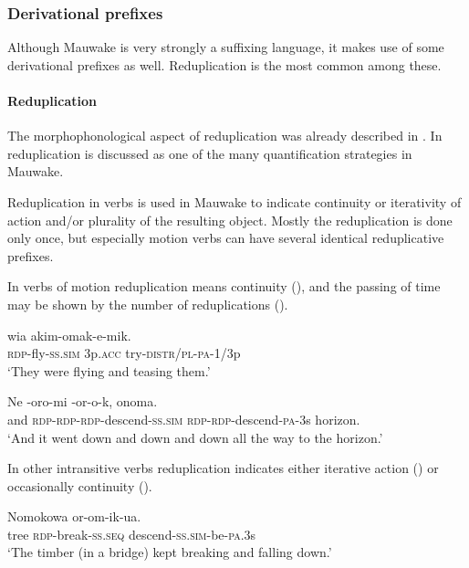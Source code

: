 \subsubsection[Derivational prefixes]{Derivational prefixes}
{}
Although Mauwake is very strongly a suffixing language, it makes use of some derivational prefixes as well. Reduplication is the most common among these. 

\paragraph[Reduplication]{Reduplication}
{}
The morphophonological aspect of reduplication was already described in . In  reduplication is discussed as one of the many quantification strategies in Mauwake.

Reduplication in verbs is used in Mauwake to indicate continuity or iterativity of action and/or plurality of the resulting object. Mostly the reduplication is done only once, but especially motion verbs can have several identical reduplicative prefixes. 

In verbs of motion reduplication means continuity (), and the passing of time may be shown by the number of reduplications ().

\ea%
\label{ex:x218}
\gll {} wia akim-omak-e-mik. \\
\textsc{rdp}-fly-\textsc{ss}.\textsc{sim} 3p.\textsc{acc} try-\textsc{distr}/\textsc{pl}-\textsc{pa}-1/3p \\
\glt`They were flying and teasing them.' 
\z

\ea%
\label{ex:x216}
\gll Ne -oro-mi -or-o-k, onoma.\\
and \textsc{rdp}-\textsc{rdp}-\textsc{rdp}-descend-\textsc{ss}.\textsc{sim} \textsc{rdp}-\textsc{rdp}-descend-\textsc{pa}-3s horizon.\\
\glt`And it went down and down and down all the way to the horizon.'
\z

In other intransitive verbs reduplication indicates either iterative action () or occasionally continuity ().

\ea%
\label{ex:x217}
\gll Nomokowa  or-om-ik-ua. \\
tree \textsc{rdp}-break-\textsc{ss}.\textsc{seq} descend-\textsc{ss}.\textsc{sim}-be-\textsc{pa}.3s\\
\glt`The timber (in a bridge) kept breaking and falling down.' 
\z

